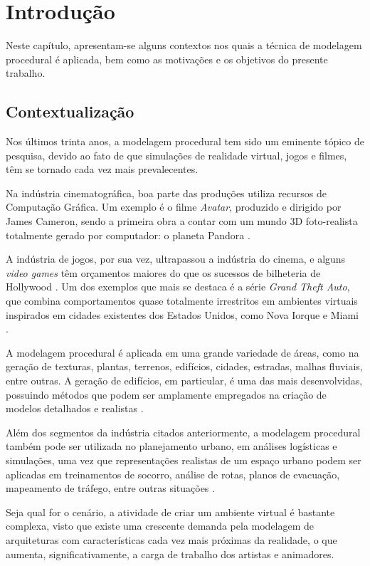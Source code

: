\chapter{Introdução}
\label{cap:introducao}

Neste capítulo, apresentam-se alguns contextos nos quais a técnica de modelagem procedural é aplicada, bem como as motivações e os objetivos do presente trabalho.

\section{Contextualização}
\label{sec:contextualização}

Nos últimos trinta anos, a modelagem procedural tem sido um eminente tópico de pesquisa, devido ao fato de que simulações de realidade virtual, jogos e filmes, têm se tornado cada vez mais prevalecentes. 

Na indústria cinematográfica, boa parte das produções utiliza recursos de Computação Gráfica. Um exemplo é o filme \textit{Avatar}, produzido e dirigido por James Cameron, sendo a primeira obra a contar com um mundo 3D foto-realista totalmente gerado por computador: o planeta Pandora \cite{simon2011}.

A indústria de jogos, por sua vez, ultrapassou a indústria do cinema, e alguns \textit{video games} têm orçamentos maiores do que os sucessos de bilheteria de Hollywood \cite{teboul2011}. Um dos exemplos que mais se destaca é a série \textit{Grand Theft Auto}, que combina comportamentos quase totalmente irrestritos em ambientes virtuais inspirados em cidades existentes dos Estados Unidos, como Nova Iorque e Miami \cite{simon2011}.

A modelagem procedural é aplicada em uma grande variedade de áreas, como na geração de texturas, plantas, terrenos, edifícios, cidades, estradas, malhas fluviais, entre outras. A geração de edifícios, em particular, é uma das mais desenvolvidas, possuindo métodos que podem ser amplamente empregados na criação de modelos detalhados e realistas \cite{smelik2014}. 

Além dos segmentos da indústria citados anteriormente, a modelagem procedural também pode ser utilizada no planejamento urbano, em análises logísticas e simulações, uma vez que representações realistas de um espaço urbano podem ser aplicadas em treinamentos de socorro, análise de rotas, planos de evacuação, mapeamento de tráfego, entre outras situações \cite{francisco2014}.

Seja qual for o cenário, a atividade de criar um ambiente virtual é bastante complexa, visto que existe uma crescente demanda pela modelagem de arquiteturas com características cada vez mais próximas da realidade, o que aumenta, significativamente, a carga de trabalho dos artistas e animadores.

